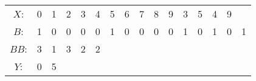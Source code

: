 \begin{tabular}{c|c|c|c|c|c|c|c|c|c|c|c|c|c|c|c|}
	\cline{2-15}
	$X$: & 0 & 1 & 2 & 3 & 4 & 5 & 6 & 7 & 8 & 9 & 3 & 5 & 4 & 9 \\
	\cline{2-16}
	$B$: & 1 & 0 & 0 & 0 & 0 & 1 & 0 & 0 & 0 & 0 & 1 & 0 & 1 & 0 & 1 \\
	\cline{2-16}
	$BB$: & 3 & 1 & 3 & 2 & 2 \\
	\cline{2-6}
	$Y$: & 0 & 5 \\
	\cline{2-3}
\end{tabular}
